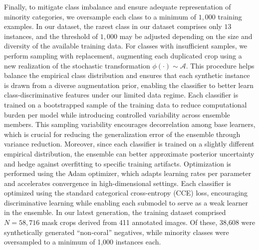 \documentclass[11pt]{elsarticle}
\begin{document}
Finally, to mitigate class imbalance and ensure adequate representation of minority categories, we oversample each class to a minimum of $1{,}000$ training examples. In our dataset, the rarest class in our dataset comprises only $13$ instances, and the threshold of $1,000$ may be adjusted depending on the size and diversity of the available training data. For classes with insufficient samples, we perform sampling with replacement, augmenting each duplicated crop using a new realization of the stochastic transformation $\phi(\cdot) \sim \mathcal{A}$. This procedure helps balance the empirical class distribution and ensures that each synthetic instance is drawn from a diverse augmentation prior, enabling the classifier to better learn class-discriminative features under our limited data regime. Each classifier is trained on a bootstrapped sample of the training data to reduce computational burden per model while introducing controlled variability across ensemble members. This sampling variability encourages decorrelation among base learners, which is crucial for reducing the generalization error of the ensemble through variance reduction. Moreover, since each classifier is trained on a slightly different empirical distribution, the ensemble can better approximate posterior uncertainty and hedge against overfitting to specific training artifacts. Optimization is performed using the Adam optimizer, which adapts learning rates per parameter and accelerates convergence in high-dimensional settings. Each classifier is optimized using the standard categorical cross-entropy (CCE) loss, encouraging discriminative learning while enabling each submodel to serve as a weak learner in the ensemble.  In our latest generation, the training dataset comprised $N=58{,}716$ mask crops derived from 411 annotated images. Of these, 38,608 were synthetically generated ``non-coral'' negatives, while minority classes were oversampled to a minimum of 1,000 instances each.
\end{document}
